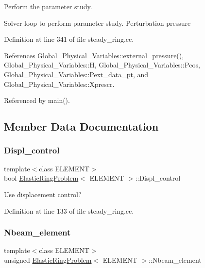 Perform the parameter study. 

Solver loop to perform parameter study. Perturbation pressure 

Definition at line 341 of file steady\+\_\+ring.\+cc.



References Global\+\_\+\+Physical\+\_\+\+Variables\+::external\+\_\+pressure(), Global\+\_\+\+Physical\+\_\+\+Variables\+::H, Global\+\_\+\+Physical\+\_\+\+Variables\+::\+Pcos, Global\+\_\+\+Physical\+\_\+\+Variables\+::\+Pext\+\_\+data\+\_\+pt, and Global\+\_\+\+Physical\+\_\+\+Variables\+::\+Xprescr.



Referenced by main().



\subsection{Member Data Documentation}
\mbox{\label{classElasticRingProblem_a919d11c9d2167d909c4d4563e9ca83b6}} 
\subsubsection{\texorpdfstring{Displ\+\_\+control}{Displ\_control}}
{\footnotesize\ttfamily template$<$class E\+L\+E\+M\+E\+NT$>$ \\
bool \hyperlink{classElasticRingProblem}{Elastic\+Ring\+Problem}$<$ E\+L\+E\+M\+E\+NT $>$\+::Displ\+\_\+control\hspace{0.3cm}{\ttfamily [private]}}



Use displacement control? 



Definition at line 133 of file steady\+\_\+ring.\+cc.

\mbox{\label{classElasticRingProblem_aa57e3dd4e9a5187ef7394b019e68b1ca}} 
\subsubsection{\texorpdfstring{Nbeam\+\_\+element}{Nbeam\_element}}
{\footnotesize\ttfamily template$<$class E\+L\+E\+M\+E\+NT$>$ \\
unsigned \hyperlink{classElasticRingProblem}{Elastic\+Ring\+Problem}$<$ E\+L\+E\+M\+E\+NT $>$\+::Nbeam\+\_\+element\hspace{0.3cm}{\ttfamily [private]}}




